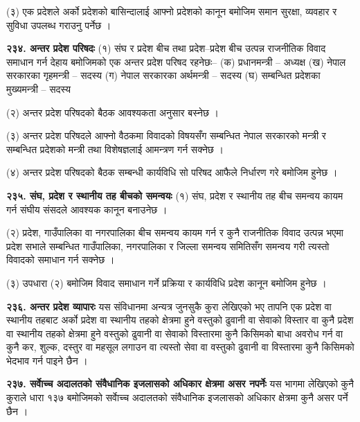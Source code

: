 (३) एक प्रदेशले अर्को प्रदेशको बासिन्दालाई आफ्नो प्रदेशको कानून बमोजिम समान सुरक्षा, व्यवहार र सुविधा उपलब्ध गराउनु पर्नेछ ।

\textbf{२३४. अन्तर प्रदेश परिषदः} (१) संघ र प्रदेश बीच तथा प्रदेश–प्रदेश बीच उत्पन्न राजनीतिक विवाद समाधान गर्न देहाय बमोजिमको एक अन्तर प्रदेश परिषद रहनेछः–
(क) प्रधानमन्त्री – अध्यक्ष
(ख) नेपाल सरकारका गृहमन्त्री – सदस्य
(ग) नेपाल सरकारका अर्थमन्त्री – सदस्य
(घ) सम्बन्धित प्रदेशका मुख्यमन्त्री – सदस्य

(२) अन्तर प्रदेश परिषदको बैठक आवश्यकता अनुसार बस्नेछ ।

(३) अन्तर प्रदेश परिषदले आफ्नो वैठकमा विवादको विषयसँग सम्बन्धित नेपाल सरकारको मन्त्री र सम्बन्धित प्रदेशको मन्त्री तथा
विशेषज्ञलाई आमन्त्रण गर्न सक्नेछ ।

(४) अन्तर प्रदेश परिषदको बैठक सम्बन्धी कार्यविधि सो परिषद आफैले निर्धारण गरे बमोजिम हुनेछ ।

\textbf{२३५. संघ, प्रदेश र स्थानीय तह बीचको समन्वयः} (१) संघ, प्रदेश र स्थानीय तह बीच समन्वय कायम गर्न संघीय संसदले आवश्यक कानून बनाउनेछ ।

(२) प्रदेश, गाउँपालिका वा नगरपालिका बीच समन्वय कायम गर्न र कुनै राजनीतिक विवाद उत्पन्न भएमा प्रदेश सभाले सम्बन्धित गाउँपालिका, नगरपालिका र जिल्ला समन्वय समितिसँग समन्वय गरी त्यस्तो विवादको समाधान गर्न सक्नेछ ।

(३) उपधारा (२) बमोजिम विवाद समाधान गर्ने प्रक्रिया र कार्यविधि प्रदेश कानून बमोजिम हुनेछ ।

\textbf{२३६. अन्तर प्रदेश व्यापारः} यस संविधानमा अन्यत्र जुनसुकै कुरा लेखिएको भए तापनि एक प्रदेश वा स्थानीय तहबाट अर्को प्रदेश वा स्थानीय तहको क्षेत्रमा हुने वस्तुको ढुवानी वा सेवाको विस्तार वा कुनै प्रदेश वा स्थानीय तहको क्षेत्रमा हुने वस्तुको ढुवानी वा सेवाको विस्तारमा कुनै किसिमको बाधा अवरोध गर्न वा कुनै कर, शुल्क, दस्तुर वा महसूल लगाउन वा त्यस्तो सेवा वा वस्तुको ढुवानी वा विस्तारमा कुनै किसिमको भेदभाव गर्न पाइने छैन ।

\textbf{२३७. सर्वाेच्च अदालतको संवैधानिक इजलासको अधिकार क्षेत्रमा असर नपर्नेः} यस भागमा लेखिएको कुनै कुराले धारा १३७ बमोजिमको सर्वाेच्च अदालतको संवैधानिक इजलासको अधिकार क्षेत्रमा कुनै असर पर्ने छैन ।